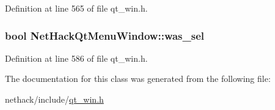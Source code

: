 Definition at line 565 of file qt\+\_\+win.\+h.

\hypertarget{classNetHackQtMenuWindow_a7aeae1d296f7391cec0d59417b7acf66}{
\subsubsection[{was\+\_\+sel}]{\setlength{\rightskip}{0pt plus 5cm}bool Net\+Hack\+Qt\+Menu\+Window\+::was\+\_\+sel\hspace{0.3cm}{\ttfamily [private]}}}\label{classNetHackQtMenuWindow_a7aeae1d296f7391cec0d59417b7acf66}


Definition at line 586 of file qt\+\_\+win.\+h.



The documentation for this class was generated from the following file\+:\begin{DoxyCompactItemize}
\item 
nethack/include/\hyperlink{qt__win_8h}{qt\+\_\+win.\+h}\end{DoxyCompactItemize}
